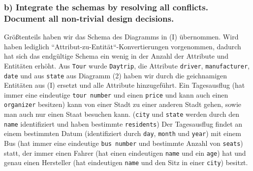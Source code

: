 \documentclass[11pt,a4paper,DIV=9]{scrartcl}
\newcommand{\teil}[2][]{
  \subsubsection*{#2) #1}
}
\begin{document}
\teil[Integrate the schemas by resolving all conflicts. Document all non-trivial design decisions.]{b}
Gr\"o{\ss}tenteils haben wir das Schema des Diagramms in (I) \"ubernommen. Wird haben lediglich ``Attribut-zu-Entit\"at``-Konvertierungen vorgenommen, dadurch hat sich das endg\"ultige Schema ein wenig in der Anzahl der Attribute und Entit\"aten erh\"oht. Aus \texttt{Tour} wurde \texttt{Daytrip}, die Attribute \texttt{driver}, \texttt{manufacturer}, \texttt{date} und aus \texttt{state} aus Diagramm (2) haben wir durch die geichnamigen Entit\"aten aus (I) ersetzt und alle Attribute hinzugef\"uhrt. 
Ein Tagesausflug (hat immer eine eindeutige \texttt{tour number} und einen \texttt{price} und kann auch einen \texttt{organizer} besitzen) kann von einer Stadt zu einer anderen Stadt gehen, sowie man auch nur einen Staat besuchen kann. (\texttt{city} und \texttt{state} werden durch den \texttt{name} identifiziert und haben bestimmte \texttt{residents}) Der Tagesausflug findet an einem bestimmten Datum (identifiziert durch \texttt{day}, \texttt{month} und \texttt{year}) mit einem Bus (hat immer eine eindeutige \texttt{bus number} und bestimmte Anzahl von \texttt{seats}) statt, der immer einen Fahrer (hat einen eindeutigen \texttt{name} und ein \texttt{age}) hat und genau einen Hersteller (hat eindeutigen \texttt{name} und den Sitz in einer \texttt{city}) besitzt.
\end{document}

